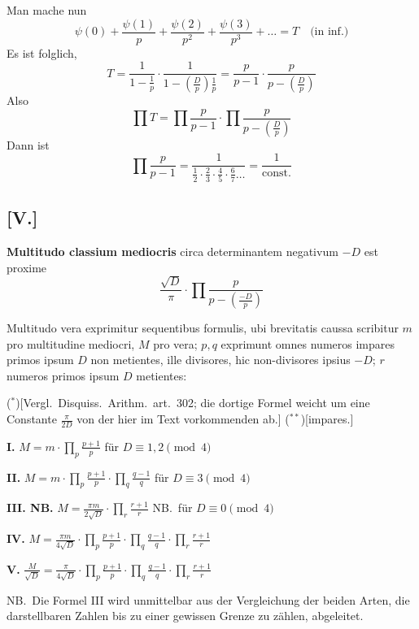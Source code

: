 \documentclass[12pt,a4paper]{article}
\begin{document}
Man mache nun
\[
\psi(0) + \frac{\psi(1)}{p} + \frac{\psi(2)}{p^2} + \frac{\psi(3)}{p^3} + \ldots = T \quad\text{(in inf.)}
\]
Es ist folglich,
\[
T = \frac{1}{1-\frac{1}{p}}\cdot\frac{1}{1-\left(\frac{D}{p}\right)\frac{1}{p}} = \frac{p}{p-1}\cdot\frac{p}{p-\left(\frac{D}{p}\right)}
\]
Also
\[
\prod T = \prod\frac{p}{p-1}\cdot\prod\frac{p}{p-\left(\frac{D}{p}\right)}
\]
Dann ist
\[
\prod\frac{p}{p-1} = \frac{1}{\frac{1}{2}\cdot\frac{2}{3}\cdot\frac{4}{5}\cdot\frac{6}{7}\ldots} = \frac{1}{\text{const.}}
\]

\subsection*{[V.]}

\textbf{Multitudo classium mediocris} circa determinantem negativum $-D$ est proxime
\[
\frac{\sqrt{D}}{\pi}\cdot\prod\frac{p}{p-\left(\frac{-D}{p}\right)}
\]

Multitudo vera exprimitur sequentibus formulis, ubi brevitatis caussa scribitur $m$ pro multitudine mediocri, $M$ pro vera; $p, q$ exprimunt omnes numeros impares primos ipsum $D$ non metientes, ille divisores, hic non-divisores ipsius $-D$; $r$ numeros primos ipsum $D$ metientes:

\begin{center}
($^\ast$)[Vergl.\ Disquiss.\ Arithm.\ art.\ 302; die dortige Formel weicht um eine Constante $\frac{\pi}{2D}$ von der hier im Text vorkommenden ab.] ($^{\ast\ast}$)[impares.]
\end{center}

\textbf{I.} $M = m \cdot \prod\limits_{p} \frac{p+1}{p}$ \quad f\"ur $D\equiv 1,2 \pmod{4}$

\textbf{II.} $M = m \cdot \prod\limits_{p} \frac{p+1}{p} \cdot \prod\limits_{q} \frac{q-1}{q}$ \quad f\"ur $D\equiv 3 \pmod{4}$

\textbf{III. NB.} $M = \frac{\pi m}{2\sqrt{D}} \cdot \prod\limits_{r} \frac{r+1}{r}$ \quad NB.\ f\"ur $D\equiv 0 \pmod{4}$

\textbf{IV.} $M = \frac{\pi m}{4\sqrt{D}} \cdot \prod\limits_{p} \frac{p+1}{p} \cdot \prod\limits_{q} \frac{q-1}{q} \cdot \prod\limits_{r} \frac{r+1}{r}$

\textbf{V.} $\frac{M}{\sqrt{D}} = \frac{\pi}{4\sqrt{D}} \cdot \prod\limits_{p} \frac{p+1}{p} \cdot \prod\limits_{q} \frac{q-1}{q} \cdot \prod\limits_{r} \frac{r+1}{r}$

NB.\ Die Formel III wird unmittelbar aus der Vergleichung der beiden Arten, die darstellbaren Zahlen bis zu einer gewissen Grenze zu z\"ahlen, abgeleitet.
\end{document}
